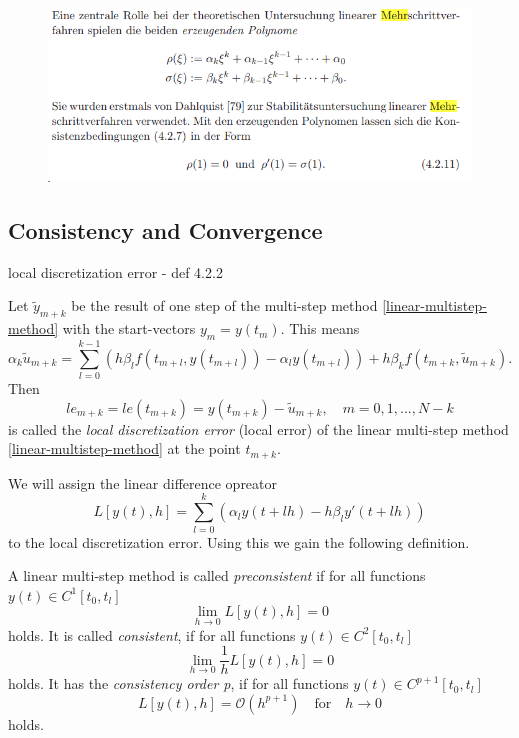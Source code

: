 	\begin{figure}[H]
		\centering
		\includegraphics[width=0.7\linewidth]{screenshot013}
		\caption{}
		\label{fig:screenshot013}
	\end{figure}
	
	
	\subsection{Consistency and Convergence}
	local discretization error - def 4.2.2
	\begin{definition}
		Let $\tilde{y}_{m+k}$ be the result of one step of the multi-step method \ref{linear-multistep-method} with the start-vectors $y_m = y(t_m)$. This means
		\begin{displaymath}
			\alpha_k \tilde{u}_{m+k} = \sum_{l=0}^{k-1} \left( h \beta_l f(t_{m+l}, y(t_{m+l})) - \alpha_l y(t_{m+l}) \right) + h \beta_k f(t_{m+k}, \tilde{u}_{m+k}) .
		\end{displaymath}
		Then
		\begin{displaymath}
			le_{m+k} = le(t_{m+k}) = y(t_{m+k}) - \tilde{u}_{m+k}, \quad m=0,1,...,N-k
		\end{displaymath}
		is called the \emph{local discretization error} (local error) of the linear multi-step method \ref{linear-multistep-method} at the point $t_{m+k}$.
	\end{definition}
	
	We will assign the linear difference opreator
	\begin{equation}
		L[y(t),h] = \sum_{l=0}^{k} \left( \alpha_l y(t+lh) - h \beta_l y'(t+lh) \right)
	\end{equation}
	to the local discretization error. Using this we gain the following definition.

	\begin{definition}
		A linear multi-step method is called \emph{preconsistent} if for all functions $y(t) \in C^1[t_0,t_l]$
		\begin{displaymath}
			\lim\limits_{h \to 0} L[y(t),h]=0
		\end{displaymath}
		holds. It is called \emph{consistent}, if for all functions $y(t) \in C^2[t_0,t_l]$
		\begin{displaymath}
			\lim\limits_{h \to 0} \frac{1}{h} L[y(t),h] = 0
		\end{displaymath}
		holds. It has the \emph{consistency order p}, if for all functions $y(t) \in C^{p+1}[t_0, t_l]$
		\begin{displaymath}
			L[y(t),h] = \mathcal{O}(h^{p+1}) \quad \text{for} \quad h \to 0
		\end{displaymath}
		holds.
	\end{definition}
	
